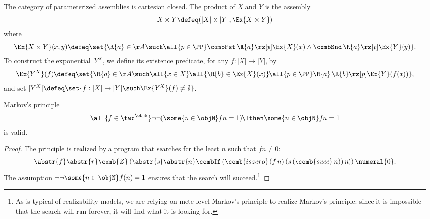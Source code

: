 The category of parameterized assemblies is cartesian closed. The product of $X$ and $Y$ is the assembly
%
\begin{equation*}
  X \times Y \defeq (|X| \times |Y|, \Ex{X \times Y})
\end{equation*}
%
where
%
\begin{equation*}
  \Ex{X \times Y}(x, y) \defeq
  \set{\R{a} \in \AA \such
  \all{p \in \PP} \combFst \, \R{a} \rz[p] \Ex{X}(x) \land \combSnd \, \R{a} \rz[p] \Ex{Y}(y)}.
\end{equation*}
%
To construct the exponential~$Y^X$, we define its existence predicate, for any $f : |X| \to |Y|$, by
%
\begin{equation*}
  \Ex{Y^X}(f) \defeq
  \set{\R{a} \in \AA \such
    \all{x \in X} \all{\R{b} \in \Ex{X}(x)} \all{p \in \PP}
      \R{a} \, \R{b} \rz[p] \Ex{Y}(f(x))
  },
\end{equation*}
%
and set $|Y^X| \defeq \set{f : |X| \to |Y| \such \Ex{Y^X}(f) \neq \emptyset}$.

\begin{proposition}
  \label{prop:markov-principle}%
  Markov's principle
  \begin{equation*}
    \all{f \in \two^\objN} \neg \neg (\some{n \in \objN} f n = 1) \lthen \some{n \in \objN} f n = 1
  \end{equation*}
  is valid.
\end{proposition}

\begin{proof}
  The principle is realized by a program that searches for the least $n$ such that $f n \neq 0$:
  \begin{equation*}
    \abstr{f} \abstr{r}
    \comb{Z} \, (\abstr{s} \abstr{n}
         \combIf \,
         (\comb{iszero} \,
         (f \, n) \,
         (s \, (\comb{succ} \, n)) \,
         n))
     \, \numeral{0}.
  \end{equation*}
  The assumption $\neg\neg{\some{n \in \objN} f(n) = 1}$ ensures that the search will succeed.\footnote{As is typical of realizability models, we are relying on mete-level Markov's principle to realize Markov's principle: since it is impossible that the search will run forever, it will find what it is looking for.}
\end{proof}

